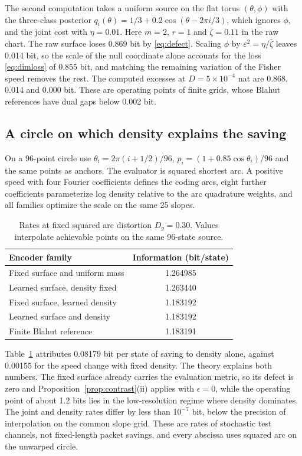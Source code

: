 \documentclass[journal]{IEEEtran}
\begin{document}
The second computation takes a uniform source on the flat torus $(\theta,\phi)$ with the three-class posterior $q_i(\theta)=1/3+0.2\cos(\theta-2\pi i/3)$, which ignores $\phi$, and the joint cost with $\eta=0.01$. Here $m=2$, $r=1$ and $\bar\zeta=0.11$ in the raw chart. The raw surface loses 0.869 bit by \eqref{eq:defect}. Scaling $\phi$ by $\varepsilon^2=\eta/\bar\zeta$ leaves 0.014 bit, so the scale of the null coordinate alone accounts for the loss \eqref{eq:dimloss} of 0.855 bit, and matching the remaining variation of the Fisher speed removes the rest. The computed excesses at $D=5\times10^{-4}$ nat are 0.868, 0.014 and 0.000 bit. These are operating points of finite grids, whose Blahut references have dual gaps below 0.002 bit.

\subsection{A circle on which density explains the saving}
On a 96-point circle use $\theta_i=2\pi(i+1/2)/96$, $p_i=(1+0.85\cos\theta_i)/96$ and the same points as anchors. The evaluator is squared shortest arc. A positive speed with four Fourier coefficients defines the coding arcs, eight further coefficients parameterize log density relative to the arc quadrature weights, and all families optimize the scale on the same 25 slopes.
\begin{table}[t]
\caption{Rates at fixed squared arc distortion $D_g=0.30$. Values interpolate achievable points on the same 96-state source.}\label{tab:circle}\centering
\begin{tabular}{lc}\toprule Encoder family & Information (bit/state)\\\midrule
Fixed surface and uniform mass & 1.264985\\
Learned surface, density fixed & 1.263440\\
Fixed surface, learned density & 1.183192\\
Learned surface and density & 1.183192\\
Finite Blahut reference & 1.183191\\\bottomrule
\end{tabular}\end{table}
Table~\ref{tab:circle} attributes 0.08179 bit per state of saving to density alone, against 0.00155 for the speed change with fixed density. The theory explains both numbers. The fixed surface already carries the evaluation metric, so its defect is zero and Proposition~\ref{prop:contrast}(ii) applies with $\epsilon=0$, while the operating point of about 1.2 bits lies in the low-resolution regime where density dominates. The joint and density rates differ by less than $10^{-7}$ bit, below the precision of interpolation on the common slope grid. These are rates of stochastic test channels, not fixed-length packet savings, and every abscissa uses squared arc on the unwarped circle.
\end{document}
